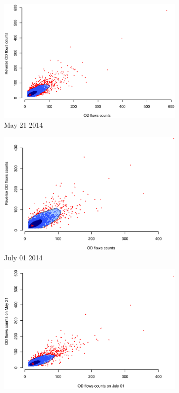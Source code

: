 \documentclass[a4paper,UKenglish]{lipics-v2016}
\begin{document}
\begin{figure}
	\centering
	\begin{subfigure}[b]{0.49\textwidth}
		\includegraphics[width=\textwidth]{images/OD_0521.eps}
		\caption{May 21 2014}
		\label{fig:OD_0521}
	\end{subfigure}
	\hfill %
	\begin{subfigure}[b]{0.49\textwidth}
		\includegraphics[width=\textwidth]{images/OD_0701.eps}
		\caption{July 01 2014}
		\label{fig:OD_0721}
	\end{subfigure}
    \hfill
	\begin{subfigure}[b]{0.49\textwidth}
	\includegraphics[width=\textwidth]{images/OD_0701_0521.eps}

\end{subfigure}
\end{figure}
\end{document}
